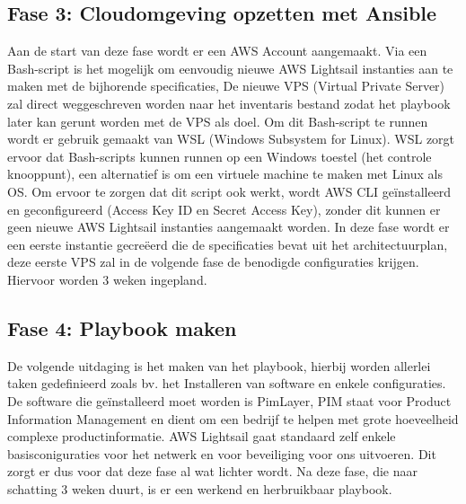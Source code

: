 \subsection{Fase 3: Cloudomgeving opzetten met Ansible}
\label{subsec:Fase 3: Cloudomgeving opzetten met Ansible}
Aan de start van deze fase wordt er een AWS Account aangemaakt. Via een Bash-script is het mogelijk om eenvoudig nieuwe AWS Lightsail 
instanties aan te maken met de bijhorende specificaties, De nieuwe VPS (Virtual Private Server) zal direct weggeschreven worden 
naar het inventaris bestand zodat het playbook later kan gerunt worden met de VPS als doel. 
Om dit Bash-script te runnen wordt er gebruik gemaakt van WSL (Windows Subsystem for Linux). WSL zorgt ervoor dat Bash-scripts kunnen 
runnen op een Windows toestel (het controle knooppunt), een alternatief is om een virtuele machine te maken met Linux als OS. Om ervoor te zorgen 
dat dit script ook werkt, wordt AWS CLI geïnstalleerd en geconfigureerd (Access Key ID en Secret Access Key), 
zonder dit kunnen er geen nieuwe AWS Lightsail instanties aangemaakt worden. 
In deze fase wordt er een eerste instantie gecreëerd die de specificaties bevat uit het architectuurplan, deze eerste VPS 
zal in de volgende fase de benodigde configuraties krijgen. Hiervoor worden 3 weken ingepland.

\subsection{Fase 4: Playbook maken}
\label{subsec:Fase 4: Playbook maken}
De volgende uitdaging is het maken van het playbook, hierbij worden allerlei taken gedefinieerd zoals bv. het Installeren van 
software en enkele configuraties. De software die geïnstalleerd moet worden is PimLayer, PIM staat voor Product Information 
Management en dient om een bedrijf te helpen met grote hoeveelheid complexe productinformatie. 
AWS Lightsail gaat standaard zelf enkele basisconiguraties voor het netwerk en voor beveiliging 
voor ons uitvoeren. Dit zorgt er dus voor dat deze fase al wat lichter wordt. Na deze fase, die naar schatting 
3 weken duurt, is er een werkend en herbruikbaar playbook. 

